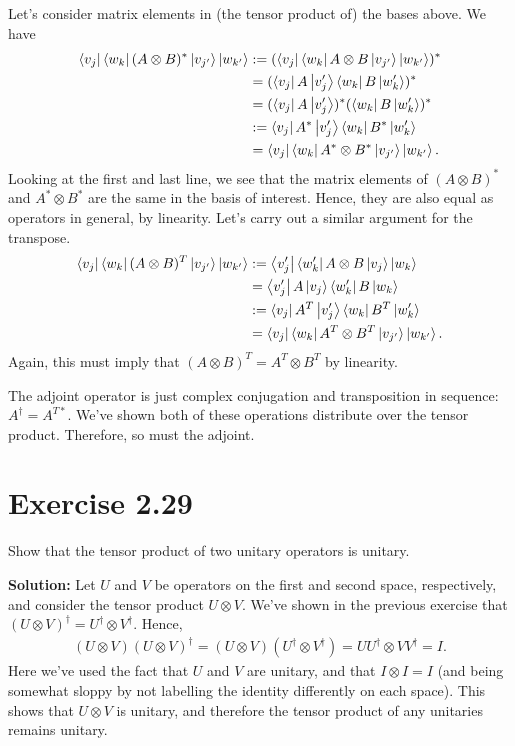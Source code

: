\documentclass{book}
\begin{document}
    Let's consider matrix elements in (the tensor product of) the bases above. We have
    \begin{align}
    \begin{aligned}
        \bra{v_j}\bra{w_k} (A\otimes B)^* \ket{v_{j'}}\ket{w_{k'}} &:= (\bra{v_j}\bra{w_k} A\otimes B \ket{v_{j'}}\ket{w_{k'}})^* \\
        &= (\bra{v_j}A\ket{v_j'} \bra{w_k}B\ket{w_k'})^* \\
        &= (\bra{v_j}A\ket{v_j'})^* (\bra{w_k}B\ket{w_k'})^* \\
        &:=\bra{v_j}A^*\ket{v_j'}\bra{w_k}B^*\ket{w_k'}\\
        &= \bra{v_j}\bra{w_k} A^*\otimes B^* \ket{v_{j'}}\ket{w_{k'}}.
    \end{aligned}
    \end{align}
    Looking at the first and last line, we see that the matrix elements of $(A\otimes B)^*$ and $A^* \otimes B^*$ are the same in the basis of interest. Hence, they are also equal as operators in general, by linearity. Let's carry out a similar argument for the transpose.
    \begin{align}
    \begin{aligned}
        \bra{v_j}\bra{w_k} (A\otimes B)^T \ket{v_{j'}}\ket{w_{k'}} &:= \bra{v_j'}\bra{w_k'} A\otimes B \ket{v_{j}}\ket{w_{k}} \\
        &= \bra{v_j'}A\ket{v_j} \bra{w_k'}B\ket{w_k} \\
        &:=\bra{v_j}A^T\ket{v_j'}\bra{w_k}B^T\ket{w_k'}\\
        &= \bra{v_j}\bra{w_k} A^T\otimes B^T \ket{v_{j'}}\ket{w_{k'}}.
    \end{aligned}
    \end{align}
    Again, this must imply that $(A\otimes B)^T = A^T \otimes B^T$ by linearity.
    
    The adjoint operator is just complex conjugation and transposition in sequence: $A^\dagger = A^{T*}$. We've shown both of these operations distribute over the tensor product. Therefore, so must the adjoint.
    
\section*{Exercise 2.29}
    Show that the tensor product of two unitary operators is unitary.
    
    \textbf{Solution:} Let $U$ and $V$ be operators on the first and second space, respectively, and consider the tensor product $U\otimes V$. We've shown in the previous exercise that $(U \otimes V)^\dagger = U^\dagger \otimes V^\dagger$. Hence,
    \begin{align}
        (U\otimes V)(U \otimes V)^\dagger = (U\otimes V)(U^\dagger \otimes V^\dagger) = U U^\dagger \otimes V V^\dagger = I. 
    \end{align}
    Here we've used the fact that $U$ and $V$ are unitary, and that $I\otimes I = I$ (and being somewhat sloppy by not labelling the identity differently on each space). This shows that $U\otimes V$ is unitary, and therefore the tensor product of any unitaries remains unitary.
\end{document}
